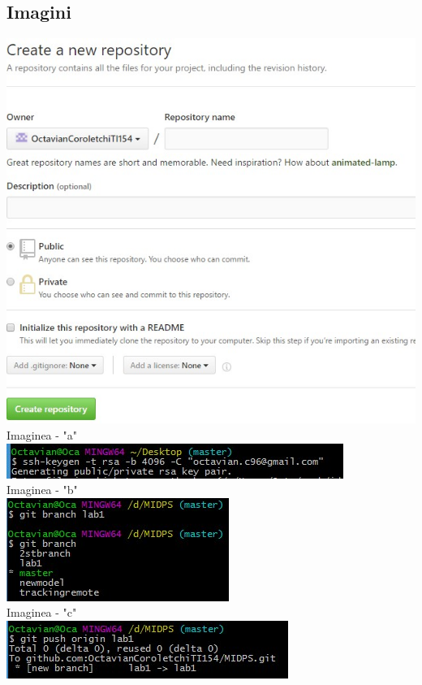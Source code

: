 \subsection{Imagini}
\begin{center}
\includegraphics[scale=0.5]{a} \\ 
Imaginea - "a" \\
\vspace{10 mm}
\includegraphics[scale=1]{b} \\
Imaginea - "b" \\
\vspace{10 mm}
\includegraphics[scale=1]{c} \\
Imaginea - "c" \\
\vspace{10 mm}
\includegraphics[scale=1]{c-1} \\

\end{center}
